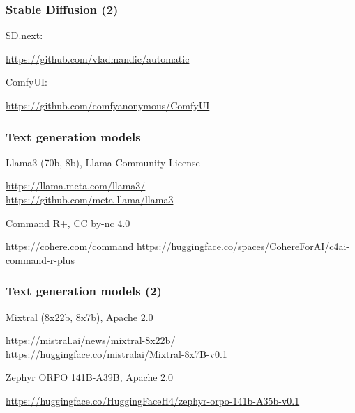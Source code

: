 \documentclass[17pt,aspectratio=169,hyperref={pdfusetitle,colorlinks,allcolors=olive}]{beamer}
\begin{document}
\begin{frame}[fragile]
\frametitle{Stable Diffusion (2)}

SD.next:
\begin{flushright}
\url{https://github.com/vladmandic/automatic}
\end{flushright}

ComfyUI:
\begin{flushright}
\url{https://github.com/comfyanonymous/ComfyUI}
\end{flushright}

\end{frame}

\begin{frame}[fragile]
\frametitle{Text generation models}

Llama3 (70b, 8b), Llama Community License
\begin{flushright}
  \url{https://llama.meta.com/llama3/} \\
  \url{https://github.com/meta-llama/llama3} \\
\end{flushright}

Command R+,  CC by-nc 4.0

\begin{flushright}
  \url{https://cohere.com/command}
  \url{https://huggingface.co/spaces/CohereForAI/c4ai-command-r-plus}
\end{flushright}

\end{frame}

\begin{frame}[fragile]
\frametitle{Text generation models (2)}

Mixtral (8x22b, 8x7b), Apache 2.0

\begin{flushright}
  \url{https://mistral.ai/news/mixtral-8x22b/}
  \url{https://huggingface.co/mistralai/Mixtral-8x7B-v0.1}
\end{flushright}


Zephyr ORPO 141B-A39B, Apache 2.0

\begin{flushright}
  \url{https://huggingface.co/HuggingFaceH4/zephyr-orpo-141b-A35b-v0.1}
\end{flushright}

\end{frame}
\end{document}
